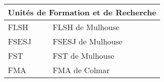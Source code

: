 
\begin{tabularx}{\linewidth}{lX}
	\toprule
	\multicolumn{2}{c}{Unités de Formation et de Recherche}\\
	\midrule
	\acrshort{FLSH} & \acrlong{FLSH} de Mulhouse\\
	\acrshort{FSESJ} & \acrlong{FSESJ} de Mulhouse\\
	\acrshort{FST} & \acrlong{FST} de Mulhouse\\
	\acrshort{FMA} & \acrlong{FMA} de Colmar\\
	\bottomrule
\end{tabularx}
